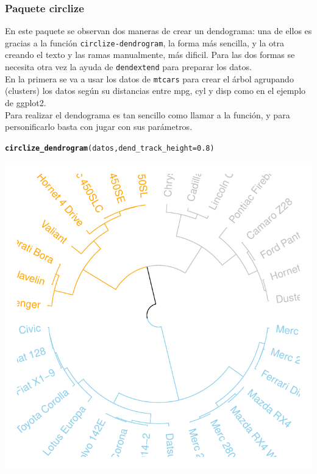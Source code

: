 \documentclass{article}\usepackage[]{graphicx}\usepackage[]{color}
\makeatletter
\def\maxwidth{ %
  \ifdim\Gin@nat@width>\linewidth
    \linewidth
  \else
    \Gin@nat@width
  \fi
}
\newcommand{\hlnum}[1]{\textcolor[rgb]{0.686,0.059,0.569}{#1}}%
\newcommand{\hlstd}[1]{\textcolor[rgb]{0.345,0.345,0.345}{#1}}%
\newcommand{\hlkwc}[1]{\textcolor[rgb]{0.333,0.667,0.333}{#1}}%
\newcommand{\hlkwd}[1]{\textcolor[rgb]{0.737,0.353,0.396}{\textbf{#1}}}%
\newenvironment{kframe}{%
 \def\at@end@of@kframe{}%
 \ifinner\ifhmode%
  \def\at@end@of@kframe{\end{minipage}}%
  \begin{minipage}{\columnwidth}%
 \fi\fi%
 \def\FrameCommand##1{\hskip\@totalleftmargin \hskip-\fboxsep
 \colorbox{shadecolor}{##1}\hskip-\fboxsep
     \hskip-\linewidth \hskip-\@totalleftmargin \hskip\columnwidth}%
 \MakeFramed {\advance\hsize-\width
   \@totalleftmargin\z@ \linewidth\hsize
   \@setminipage}}%
 {\par\unskip\endMakeFramed%
 \at@end@of@kframe}
\newenvironment{knitrout}{}{} %
\makeatother
\begin{document}
\subsubsection{Paquete circlize}
En este paquete  %
se observan dos maneras de crear un dendograma: una de ellos es gracias a la funci\'on \texttt{circlize-dendrogram}, la forma m\'as sencilla, y la otra creando el texto y las ramas manualmente, m\'as dificil.
Para las dos formas se necesita otra vez la ayuda de \texttt{dendextend} para preparar los datos.~\\ En la primera se va a usar los datos de \texttt{mtcars} para crear el \'arbol agrupando (clusters) los datos seg\'un su distancias entre mpg, cyl y disp como en el ejemplo de ggplot2.~\\
Para realizar el dendograma es tan sencillo como llamar a la funci\'on, y para personificarlo basta con jugar con sus par\'ametros.
\begin{knitrout}
\color{fgcolor}\begin{kframe}
\begin{alltt}
\hlkwd{circlize_dendrogram}\hlstd{(datos,} \hlkwc{dend_track_height} \hlstd{=} \hlnum{0.8}\hlstd{)}
\end{alltt}
\end{kframe}

{\centering \includegraphics[width=\maxwidth]{figure/plot_circlize_dendo_1-1} 

}



\end{knitrout}
\end{document}
